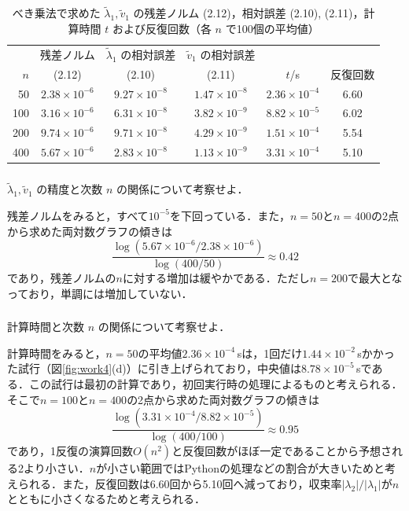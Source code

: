 \documentclass{jarticle}
\begin{document}
\begin{table}[htbp]
    \centering
    \footnotesize\setlength{\tabcolsep}{3pt}
    \caption{べき乗法で求めた $\tilde{\lambda}_1, \tilde{v}_1$ の残差ノルム (2.12)，相対誤差 (2.10), (2.11)，計算時間 $t$ および反復回数（各 $n$ で100個の平均値）}
    \label{tab:work4}
    \begin{tabular}{rccccc}
        \hline
        & 残差ノルム & $\tilde{\lambda}_1$ の相対誤差 & $\tilde{v}_1$ の相対誤差 & & \\
        $n$ & (2.12) & (2.10) & (2.11) & $t$/s & 反復回数 \\
        \hline
        50 & $2.38\times10^{-6}$ & $9.27\times10^{-8}$ & $1.47\times10^{-8}$ & $2.36\times10^{-4}$ & 6.60 \\
        100 & $3.16\times10^{-6}$ & $6.31\times10^{-8}$ & $3.82\times10^{-9}$ & $8.82\times10^{-5}$ & 6.02 \\
        200 & $9.74\times10^{-6}$ & $9.71\times10^{-8}$ & $4.29\times10^{-9}$ & $1.51\times10^{-4}$ & 5.54 \\
        400 & $5.67\times10^{-6}$ & $2.83\times10^{-8}$ & $1.13\times10^{-9}$ & $3.31\times10^{-4}$ & 5.10 \\
        \hline
    \end{tabular}
\end{table}

\subsubsection{}
$\tilde{\lambda}_1, \tilde{v}_1$ の精度と次数 $n$ の関係について考察せよ．

残差ノルムをみると，すべて$10^{-5}$を下回っている．また，$n=50$と$n=400$の2点から求めた両対数グラフの傾きは
\[
    \frac{\log(5.67\times10^{-6}/2.38\times10^{-6})}{\log(400/50)} \approx 0.42
\]
であり，残差ノルムの$n$に対する増加は緩やかである．ただし$n=200$で最大となっており，単調には増加していない．
\subsubsection{}
計算時間と次数 $n$ の関係について考察せよ．

計算時間をみると，$n=50$の平均値$2.36\times10^{-4}$\,sは，1回だけ$1.44\times10^{-2}$\,sかかった試行（図\ref{fig:work4}(d)）に引き上げられており，中央値は$8.78\times10^{-5}$\,sである．この試行は最初の計算であり，初回実行時の処理によるものと考えられる．そこで$n=100$と$n=400$の2点から求めた両対数グラフの傾きは
\[
    \frac{\log(3.31\times10^{-4}/8.82\times10^{-5})}{\log(400/100)} \approx 0.95
\]
であり，1反復の演算回数$O(n^2)$と反復回数がほぼ一定であることから予想される2より小さい．$n$が小さい範囲ではPythonの処理などの割合が大きいためと考えられる．また，反復回数は6.60回から5.10回へ減っており，収束率$|\lambda_2|/|\lambda_1|$が$n$とともに小さくなるためと考えられる．
\end{document}
